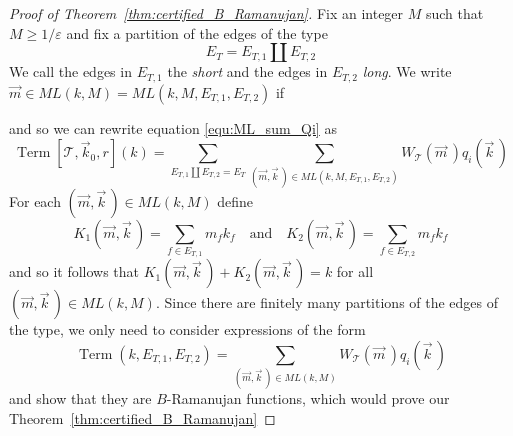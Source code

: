 \documentclass{memo-l}
\theoremstyle{plain}
\theoremstyle{definition}
\numberwithin{section}{chapter}
\numberwithin{equation}{chapter}
\DeclareMathOperator{\Term}{Term}
\newcommand{\vecmk}{(\vec m, \vec k\,)}
\theoremstyle{plain}
\theoremstyle{definition}
\newcommand\cT{\mathcal{T}}
\begin{document}
\begin{proof}[Proof of Theorem~\ref{thm:certified_B_Ramanujan}]
Fix an integer \( M \) such that \( M \geq 1/\varepsilon \) and fix a
partition of the edges of the type \[ E_T = E_{T,1} \amalg E_{T,2} \] We
call the edges in \( E_{T,1} \) the \emph{short} and the edges in \(
E_{T,2} \) \emph{long}. We write \( \vec m \in ML(k,M) = ML(k,M,E_{T,1},
E_{T,2}) \) if  and so we can rewrite equation \eqref{equ:ML_sum_Qi} as \[
\Term [ \cT, \vec k_0, r ] (k) = \sum_{E_{T,1} \amalg E_{T,2} = E_T}
\sum_{\vecmk \in ML(k,M,E_{T,1}, E_{T,2})} W_\cT(\vec m\,) q_i(\vec k\,) \]
For each \( \vecmk \in ML(k,M) \) define \begin{equation}\label{eq:K_i}
K_1\vecmk = \sum_{f \in E_{T,1}} m_f k_f \quad \text{and} \quad K_2\vecmk =
\sum_{f \in E_{T,2}} m_f k_f \end{equation} and so it follows that \(
K_1\vecmk + K_2\vecmk = k \) for all \( \vecmk \in ML(k,M) \). Since there
are finitely many partitions of the edges of the type, we only need to
consider expressions of the form \begin{equation}\label{eq:partition_term}
\Term(k,E_{T,1},E_{T,2}) = \sum_{\vecmk \in ML(k,M)} W_\cT(\vec m\,)
q_i(\vec k\,) \end{equation} and show that they are \( B \)-Ramanujan
functions, which would prove our Theorem~\ref{thm:certified_B_Ramanujan}


\end{proof}
\end{document}
